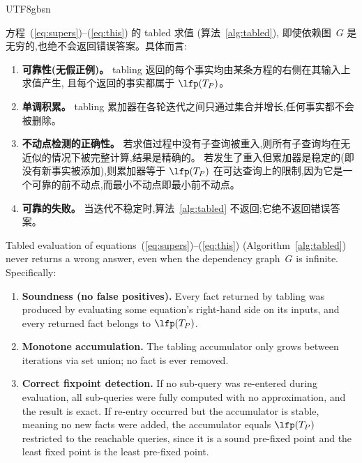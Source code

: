 \begin{CJK*}{UTF8}{gbsn}
\begin{theorem}%
  \label{thm:tabling-soundness}
  \ifPaperChinese
  方程~(\ref{eq:supers})--(\ref{eq:this}) 的 tabled 求值
  (算法~\ref{alg:tabled}),
  即使依赖图~$G$ 是无穷的,也绝不会返回错误答案。具体而言:
  \begin{enumerate}
    \item \textbf{可靠性(无假正例)。}
      tabling 返回的每个事实均由某条方程的右侧在其输入上求值产生,
      且每个返回的事实都属于 $\lfp(T_P)$。

    \item \textbf{单调积累。}
      tabling 累加器在各轮迭代之间只通过集合并增长,任何事实都不会被删除。

    \item \textbf{不动点检测的正确性。}
      若求值过程中没有子查询被重入,则所有子查询均在无近似的情况下被完整计算,结果是精确的。
      若发生了重入但累加器是稳定的(即没有新事实被添加),则累加器等于
      $\lfp(T_P)$ 在可达查询上的限制,因为它是一个可靠的前不动点,而最小不动点即最小前不动点。

    \item \textbf{可靠的失败。}
      当迭代不稳定时,算法~\ref{alg:tabled} 不返回;它绝不返回错误答案。
  \end{enumerate}
  \else
  Tabled evaluation of
  equations~(\ref{eq:supers})--(\ref{eq:this})
  (Algorithm~\ref{alg:tabled})
  never returns a wrong answer, even when the
  dependency graph~$G$ is infinite.
  Specifically:
  \begin{enumerate}
    \item \textbf{Soundness (no false positives).}
      Every fact returned by tabling was produced by
      evaluating some equation's right-hand side on its
      inputs, and every returned fact belongs to
      $\lfp(T_P)$.

    \item \textbf{Monotone accumulation.}
      The tabling accumulator only grows between
      iterations via set union; no fact is ever
      removed.

    \item \textbf{Correct fixpoint detection.}
      If no sub-query was re-entered during evaluation,
      all sub-queries were fully computed with no
      approximation, and the result is exact.
      If re-entry occurred but the accumulator is
      stable, meaning no new facts were added, the
      accumulator equals
      $\lfp(T_P)$ restricted to the reachable
      queries, since it is a sound pre-fixed point and
      the least fixed point is the least pre-fixed point.


\end{enumerate}
\end{theorem}
\end{CJK*}
